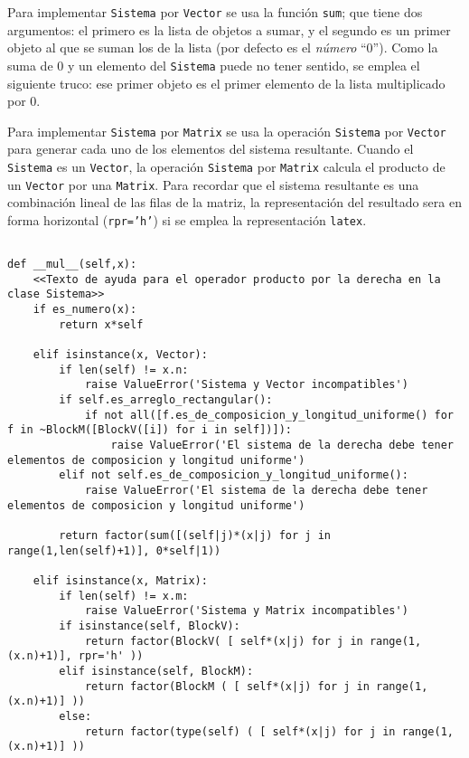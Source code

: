 \documentclass[11pt]{report}
\begin{document}
Para implementar \texttt{Sistema} por \texttt{Vector} se usa la función \texttt{sum}; que
tiene dos argumentos: el primero es la lista de objetos a sumar, y el
segundo es un primer objeto al que se suman los de la lista (por
defecto es el \emph{número} ``\(0\)''). Como la suma de \(0\) y un
elemento del \texttt{Sistema} puede no tener sentido, se emplea el siguiente
truco: ese primer objeto es el primer elemento de la lista
multiplicado por \(0\).

Para implementar \texttt{Sistema} por \texttt{Matrix} se usa la operación \texttt{Sistema}
por \texttt{Vector} para generar cada uno de los elementos del sistema
resultante. Cuando el \texttt{Sistema} es un \texttt{Vector}, la operación \texttt{Sistema}
por \texttt{Matrix} calcula el producto de un \texttt{Vector} por una \texttt{Matrix}. Para
recordar que el sistema resultante es una combinación lineal de las
filas de la matriz, la representación del resultado sera en forma
horizontal (\texttt{rpr='h'}) si se emplea la representación \texttt{latex}.

\begin{verbatim}

def __mul__(self,x):
    <<Texto de ayuda para el operador producto por la derecha en la clase Sistema>>
    if es_numero(x):
        return x*self

    elif isinstance(x, Vector):
        if len(self) != x.n:
            raise ValueError('Sistema y Vector incompatibles')
        if self.es_arreglo_rectangular():
            if not all([f.es_de_composicion_y_longitud_uniforme() for f in ~BlockM([BlockV([i]) for i in self])]):
                raise ValueError('El sistema de la derecha debe tener elementos de composicion y longitud uniforme')
        elif not self.es_de_composicion_y_longitud_uniforme():
            raise ValueError('El sistema de la derecha debe tener elementos de composicion y longitud uniforme')
            
        return factor(sum([(self|j)*(x|j) for j in range(1,len(self)+1)], 0*self|1))
    
    elif isinstance(x, Matrix):
        if len(self) != x.m:
            raise ValueError('Sistema y Matrix incompatibles')
        if isinstance(self, BlockV):
            return factor(BlockV( [ self*(x|j) for j in range(1,(x.n)+1)], rpr='h' ))
        elif isinstance(self, BlockM):
            return factor(BlockM ( [ self*(x|j) for j in range(1,(x.n)+1)] ))
        else:
            return factor(type(self) ( [ self*(x|j) for j in range(1,(x.n)+1)] ))

\end{verbatim}
\end{document}
